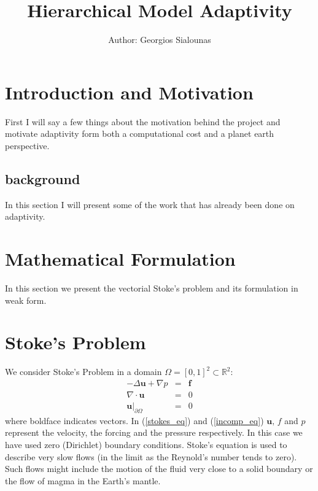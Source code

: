 \documentclass[12pt,a4paper]{article}
\title{Hierarchical Model Adaptivity}
\author{Author: Georgios Sialounas}
\theoremstyle{definition}
\begin{document}
\maketitle
\thispagestyle{empty}
\newpage
\tableofcontents
\setcounter{page}{1}


\section{Introduction and Motivation}
First I will say a few things about the motivation behind the project and motivate adaptivity form both a computational cost and a planet earth perspective.
\subsection{background}
In this section I will present some of the work that has already been done on adaptivity.

\section{Mathematical Formulation}
In this section we present the vectorial Stoke's problem and its formulation in weak form.  
\section{Stoke's Problem}
We consider Stoke's Problem in a domain $\Omega = \left[0,1\right]^2 \subset \mathbb{R}^2$:
\begin{eqnarray}\label{stokes_eq}
	-\Delta\textbf{u} + \nabla p &=& \textbf{f} \\ \label{incomp_eq}
	\nabla\cdot \textbf{u}&=& 0\\ 
\textbf{u}|_{\partial\Omega}&=&0 \label{bc_eq}
\end{eqnarray}
where boldface indicates vectors.  In (\ref{stokes_eq}) and (\ref{incomp_eq}) $\textbf{u},\, f$ and $p$ represent the velocity, the forcing and the pressure respectively.  In this case we have used zero (Dirichlet) boundary conditions. Stoke's equation is used to describe very slow flows (in the limit as the Reynold's number tends to zero).  Such flows might include the motion of the fluid very close to a solid boundary or the flow of magma in the Earth's mantle.  
\end{document}
